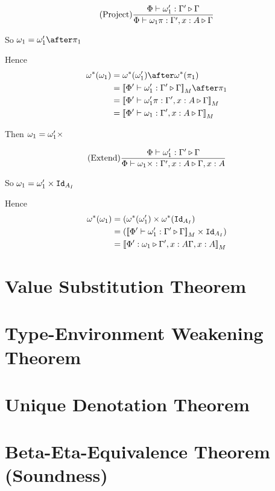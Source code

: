 \documentclass{report}
\begin{document}
\begin{equation}
    (\text{Project}) \frac{\Phi\vdash \omega_1' : \Gamma' \triangleright \Gamma}{\Phi\vdash \omega_1\pi : \Gamma',x:A \triangleright \Gamma}
\end{equation}

So $\w_1 = \w_1'\after\p$

Hence
\begin{align}
    \w\star(\w_1) &= \w\star(\w_1')\after\w\star(\p)\\
    & = \deno{\ewrel{\P'}{\w_1'}{\G'}{\G}}\after\p\\
    & = \deno{\ewrel{\P'}{\w_1'\pi}{\G',x:A}{\G}}\\
    & = \deno{\ewrel{\P'}{\w_1}{\G', x:A}{\G}}
\end{align}

Then $\omega_1 = \omega_1'\times$

\begin{equation}
    (\text{Extend}) \frac{\Phi\vdash \omega_1' : \Gamma' \triangleright \Gamma}{\Phi\vdash \omega_1\times : \Gamma',x:A \triangleright \Gamma, x: A}
\end{equation}

So $\omega_1 = \omega_1'\times\texttt{Id}_{A_I}$

Hence
\begin{align}
    \omega^*(\omega_1) &=(\omega^*(\omega_1')\times\omega^*(\texttt{Id}_{A_I})\\
    & = ({\bf [\![}\Phi'\vdash \omega_1' : \Gamma' \triangleright \Gamma{\bf ]\!]}_M\times\texttt{Id}_{A_I})\\
    & = {\bf [\![}\Phi' : \omega_1 \triangleright \Gamma',x:A{\Gamma, x: A}{\bf ]\!]}_M
\end{align}

\chapter{Value Substitution Theorem}

\chapter{Type-Environment Weakening Theorem}

\chapter{Unique Denotation Theorem}

\chapter{Beta-Eta-Equivalence Theorem (Soundness)}


    
\end{document}
